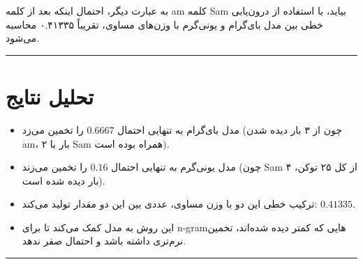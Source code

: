\documentclass[11pt,a4paper]{article}
\newcommand{\en}[1]{\textenglish{#1}}
\newcommand{\separator}{\vspace{1em}\noindent\rule{\linewidth}{0.4pt}\vspace{1em}}
\newcommand{\thickseparator}{\vspace{1em}\noindent\rule{\linewidth}{1pt}\vspace{1em}}
\begin{document}
به عبارت دیگر، احتمال اینکه بعد از کلمه \en{am} کلمه \en{Sam} بیاید، با استفاده از درون‌یابی خطی بین مدل بای‌گرام و یونی‌گرم با وزن‌های مساوی، تقریباً \en{۰.۴۱۳۳۵} محاسبه می‌شود.

\separator
\section{تحلیل نتایج}
\begin{itemize}
\item مدل بای‌گرام به تنهایی احتمال $0.6667$ را تخمین می‌زد (چون از ۳ بار دیده شدن \en{am}، ۲ بار با \en{Sam} همراه بوده است).
\item مدل یونی‌گرم به تنهایی احتمال $0.16$ را تخمین می‌زند (چون \en{Sam} از کل ۲۵ توکن، ۴ بار دیده شده است).
\item ترکیب خطی این دو با وزن مساوی، عددی بین این دو مقدار تولید می‌کند: $0.41335$.
\item این روش به مدل کمک می‌کند تا برای \en{n-gram}هایی که کمتر دیده شده‌اند، تخمین نرم‌تری داشته باشد و احتمال صفر ندهد.
\end{itemize}

\thickseparator
\end{document}
